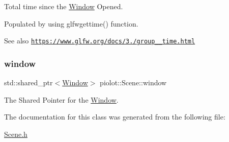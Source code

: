 Total time since the \mbox{\hyperlink{class_window}{Window}} Opened. 

Populated by using glfwgettime() function. \begin{DoxySeeAlso}{See also}
\href{https://www.glfw.org/docs/3.0/group__time.html}{\tt https\+://www.\+glfw.\+org/docs/3./group\+\_\+\+\_\+time.\+html} 
\end{DoxySeeAlso}
\mbox{\label{classpiolot_1_1_scene_a250749bf646c4ab0349bd98e515b0d5b}} 
\subsubsection{\texorpdfstring{window}{window}}
{\footnotesize\ttfamily std\+::shared\+\_\+ptr$<$\mbox{\hyperlink{class_window}{Window}}$>$ piolot\+::\+Scene\+::window\hspace{0.3cm}{\ttfamily [protected]}}



The Shared Pointer for the \mbox{\hyperlink{class_window}{Window}}. 



The documentation for this class was generated from the following file\+:\begin{DoxyCompactItemize}
\item 
\mbox{\hyperlink{_scene_8h}{Scene.\+h}}\end{DoxyCompactItemize}
